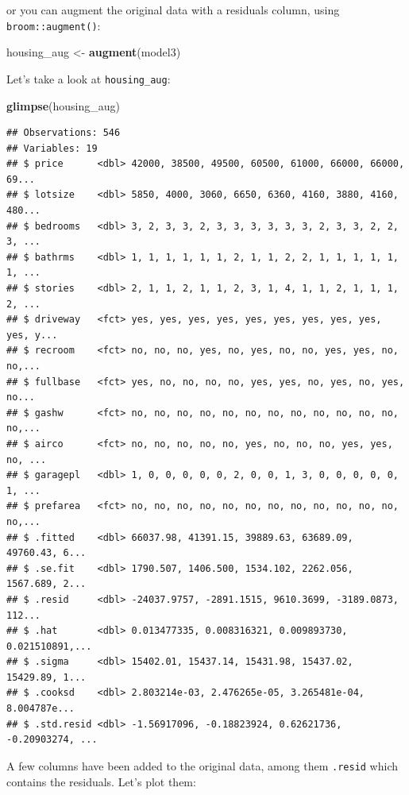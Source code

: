\documentclass[]{gitbook}
\newenvironment{Shaded}{\begin{snugshade}}{\end{snugshade}}
\newcommand{\KeywordTok}[1]{\textcolor[rgb]{0.13,0.29,0.53}{\textbf{#1}}}
\newcommand{\NormalTok}[1]{#1}
\newcommand{\StringTok}[1]{\textcolor[rgb]{0.31,0.60,0.02}{#1}}
\theoremstyle{definition}
\theoremstyle{definition}
\theoremstyle{definition}
\theoremstyle{remark}
\begin{document}
or you can augment the original data with a residuals column, using
\texttt{broom::augment()}:

\begin{Shaded}
\begin{Highlighting}[]
\NormalTok{housing_aug <-}\StringTok{ }\KeywordTok{augment}\NormalTok{(model3)}
\end{Highlighting}
\end{Shaded}

Let's take a look at \texttt{housing\_aug}:

\begin{Shaded}
\begin{Highlighting}[]
\KeywordTok{glimpse}\NormalTok{(housing_aug)}
\end{Highlighting}
\end{Shaded}

\begin{verbatim}
## Observations: 546
## Variables: 19
## $ price      <dbl> 42000, 38500, 49500, 60500, 61000, 66000, 66000, 69...
## $ lotsize    <dbl> 5850, 4000, 3060, 6650, 6360, 4160, 3880, 4160, 480...
## $ bedrooms   <dbl> 3, 2, 3, 3, 2, 3, 3, 3, 3, 3, 3, 2, 3, 3, 2, 2, 3, ...
## $ bathrms    <dbl> 1, 1, 1, 1, 1, 1, 2, 1, 1, 2, 2, 1, 1, 1, 1, 1, 1, ...
## $ stories    <dbl> 2, 1, 1, 2, 1, 1, 2, 3, 1, 4, 1, 1, 2, 1, 1, 1, 2, ...
## $ driveway   <fct> yes, yes, yes, yes, yes, yes, yes, yes, yes, yes, y...
## $ recroom    <fct> no, no, no, yes, no, yes, no, no, yes, yes, no, no,...
## $ fullbase   <fct> yes, no, no, no, no, yes, yes, no, yes, no, yes, no...
## $ gashw      <fct> no, no, no, no, no, no, no, no, no, no, no, no, no,...
## $ airco      <fct> no, no, no, no, no, yes, no, no, no, yes, yes, no, ...
## $ garagepl   <dbl> 1, 0, 0, 0, 0, 0, 2, 0, 0, 1, 3, 0, 0, 0, 0, 0, 1, ...
## $ prefarea   <fct> no, no, no, no, no, no, no, no, no, no, no, no, no,...
## $ .fitted    <dbl> 66037.98, 41391.15, 39889.63, 63689.09, 49760.43, 6...
## $ .se.fit    <dbl> 1790.507, 1406.500, 1534.102, 2262.056, 1567.689, 2...
## $ .resid     <dbl> -24037.9757, -2891.1515, 9610.3699, -3189.0873, 112...
## $ .hat       <dbl> 0.013477335, 0.008316321, 0.009893730, 0.021510891,...
## $ .sigma     <dbl> 15402.01, 15437.14, 15431.98, 15437.02, 15429.89, 1...
## $ .cooksd    <dbl> 2.803214e-03, 2.476265e-05, 3.265481e-04, 8.004787e...
## $ .std.resid <dbl> -1.56917096, -0.18823924, 0.62621736, -0.20903274, ...
\end{verbatim}

A few columns have been added to the original data, among them
\texttt{.resid} which contains the residuals. Let's plot them:
\end{document}
